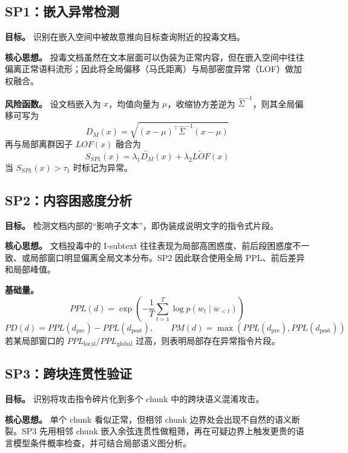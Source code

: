 \documentclass[11pt,a4paper]{ctexart}
\begin{document}
\subsection{SP1：嵌入异常检测}
\textbf{目标。} 识别在嵌入空间中被故意推向目标查询附近的投毒文档。

\textbf{核心思想。} 投毒文档虽然在文本层面可以伪装为正常内容，但在嵌入空间中往往偏离正常语料流形；因此将全局偏移（马氏距离）与局部密度异常（LOF）做加权融合。

\textbf{风险函数。} 设文档嵌入为 $x$，均值向量为 $\mu$，收缩协方差逆为 $\hat{\Sigma}^{-1}$，则其全局偏移可写为
\begin{equation}
D_M(x)=\sqrt{(x-\mu)^\top \hat{\Sigma}^{-1}(x-\mu)}
\end{equation}
再与局部离群因子 $LOF(x)$ 融合为
\begin{equation}
S_{SP1}(x)=\lambda_1 \widetilde{D_M}(x)+\lambda_2 \widetilde{LOF}(x)
\end{equation}
当 $S_{SP1}(x)>\tau_1$ 时标记为异常。

\subsection{SP2：内容困惑度分析}
\textbf{目标。} 检测文档内部的“影响子文本”，即伪装成说明文字的指令式片段。

\textbf{核心思想。} 文档投毒中的 I-subtext 往往表现为局部高困惑度、前后段困惑度不一致、或局部窗口明显偏离全局文本分布。SP2 因此联合使用全局 PPL、前后差异和局部峰值。

\textbf{基础量。}
\begin{equation}
PPL(d)=\exp\left(-\frac{1}{T}\sum_{t=1}^{T}\log p(w_t \mid w_{<t})\right)
\end{equation}
\begin{equation}
PD(d)=PPL(d_{\text{pre}})-PPL(d_{\text{post}}), \qquad
PM(d)=\max(PPL(d_{\text{pre}}), PPL(d_{\text{post}}))
\end{equation}
若某局部窗口的 $PPL_{\text{local}} / PPL_{\text{global}}$ 过高，则表明局部存在异常指令片段。

\subsection{SP3：跨块连贯性验证}
\textbf{目标。} 识别将攻击指令碎片化到多个 chunk 中的跨块语义混淆攻击。

\textbf{核心思想。} 单个 chunk 看似正常，但相邻 chunk 边界处会出现不自然的语义断裂。SP3 先用相邻 chunk 嵌入余弦连贯性做粗筛，再在可疑边界上触发更贵的语言模型条件概率检查，并可结合局部语义图分析。
\end{document}
